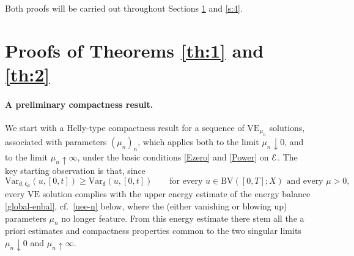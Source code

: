 \documentclass[a4paper,10pt,reqno]{amsart} %
\numberwithin{equation}{section}
\newcommand{\up}{\uparrow}
\newcommand{\down}{\downarrow}
\newcommand{\Xs}{X}
\newcommand{\BV}{\mathrm{BV}}
\newcommand{\mdn}{\mathsf{d}}
\newcommand{\Vari}[4]{\mathrm{Var}_{#1}(#2,[#3,#4])}
\newcommand{\vecostnamep}[1]{\mathsf{c}_{#1}}
\newcommand{\VE}{\mathrm{VE}}
\newcommand{\VEa}[1]{\mathrm{VE}_{#1}}
\newcommand{\VEn}{\VEa{\mu_n}}
\newcommand{\RRR}{\color{red}}
\newcommand{\EEE}{\color{black}}
\begin{document}
Both proofs will be carried out throughout Sections
\ref{s:3} and \ref{s:4}. 
\section{Proofs of Theorems \ref{th:1} and \ref{th:2}}
\label{s:3}
\paragraph{\bf A  preliminary compactness result.}  We start with a Helly-type compactness result for a sequence of  $\VEn$ solutions, associated with parameters $(\mu_n)_n$,  which applies both to the limit $\mu_n\down 0$, and to the limit $\mu_n\up \infty$, under the basic conditions  \eqref{Ezero} and  \eqref{Power} on ${\mathcal E}$. 
The key starting observation is that, since  
\begin{equation}
\label{key-est-var}
 \Vari {\mdn,\vecostnamep{\mu}}{u}0{t} \geq  \Vari {\mdn}{u}0{t}  \qquad \text{for every } u \in \BV([0,T];\Xs)   \text{ and every } \mu>0, 
 \end{equation}
  every $\VE$ solution complies with the 
upper energy estimate of the energy balance \eqref{global-enbal},  cf.\ \eqref{uee-n} below, where the (either vanishing or blowing up) parameters $\mu_n$  no longer feature. From this energy estimate there stem all the a priori estimates   and compactness properties common to the two singular limits $\mu_n \down 0$ and $\mu_n \up\infty$. %
\end{document}
